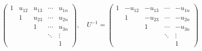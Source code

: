 \begin{property}
\begin{enumerate}
\begin{gather*}
\begin{pmatrix}
				1 & u_{12} & u_{13} & \cdots & u_{1n} \\
				& 1 & u_{23} & \cdots & u_{2n} \\
				&       & 1 & \cdots & u_{3n} \\
				&  &  & \ddots & \vdots \\
				&       &       &  & 1
			\end{pmatrix},\quad
			U^{-1}=
			\begin{pmatrix}
				1 & -u_{12} & -u_{13} & \cdots & -u_{1n} \\
				& 1 & -u_{23} & \cdots & -u_{2n} \\
				&       & 1 & \cdots & -u_{3n} \\
				&  &  & \ddots & \vdots \\
				&       &       &  & 1
			\end{pmatrix}
		\end{gather*}
	\end{enumerate}
\end{property}
